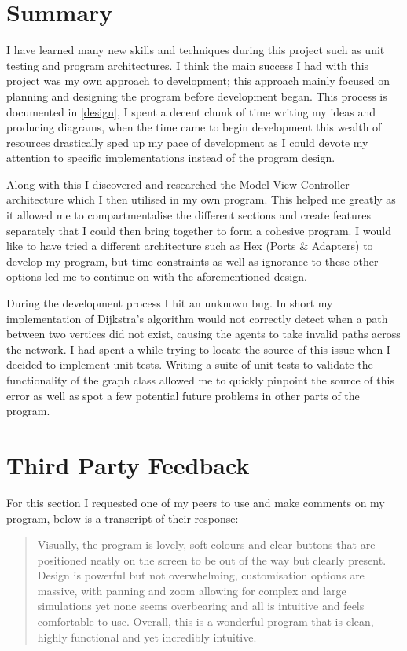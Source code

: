 \section{Summary}

    I have learned many new skills and techniques during this project such as unit testing and program architectures. I think the main success I had with this project was my own approach to development; this approach mainly focused on planning and designing the program before development began. This process is documented in \autoref{design}, I spent a decent chunk of time writing my ideas and producing diagrams, when the time came to begin development this wealth of resources drastically sped up my pace of development as I could devote my attention to specific implementations instead of the program design.

    Along with this I discovered and researched the Model-View-Controller architecture which I then utilised in my own program. This helped me greatly as it allowed me to compartmentalise the different sections and create features separately that I could then bring together to form a cohesive program. I would like to have tried a different architecture such as Hex (Ports \& Adapters) to develop my program, but time constraints as well as ignorance to these other options led me to continue on with the aforementioned design.

    During the development process I hit an unknown bug. In short my implementation of Dijkstra's algorithm would not correctly detect when a path between two vertices did not exist, causing the agents to take invalid paths across the network. I had spent a while trying to locate the source of this issue when I decided to implement unit tests. Writing a suite of unit tests to validate the functionality of the graph class allowed me to quickly pinpoint the source of this error as well as spot a few potential future problems in other parts of the program.

\section{Third Party Feedback}

    For this section I requested one of my peers to use and make comments on my program, below is a transcript of their response:

    \begin{quote}
        Visually, the program is lovely, soft colours and clear buttons that are positioned neatly on the screen to be out of the way but clearly present. Design is powerful but not overwhelming, customisation options are massive, with panning and zoom allowing for complex and large simulations yet none seems overbearing and all is intuitive and feels comfortable to use. Overall, this is a wonderful program that is clean, highly functional and yet incredibly intuitive.
    \end{quote}

